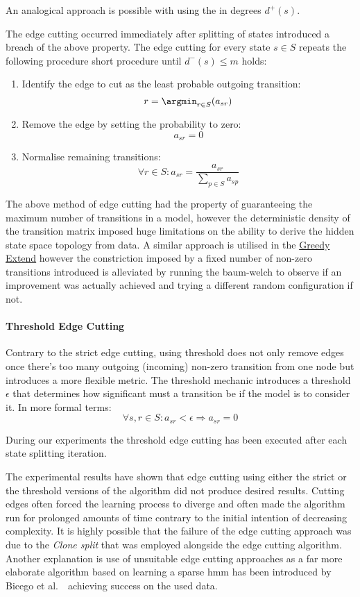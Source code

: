 An analogical approach is possible with using the in degrees $d^+(s)$.

The edge cutting occurred immediately after splitting of states introduced a breach of the above property. The edge cutting for every state $s\in S$ repeats the following procedure short procedure until $d^-(s) \le m$ holds:
\begin{enumerate}
	\item Identify the edge to cut as the least probable outgoing transition:
	$$r = \argmin_{r\in S}(a_{sr})$$
	\item Remove the edge by setting the probability to zero: $$a_{sr} = 0$$
	\item Normalise remaining transitions:
	$$\forall r \in S: a_{sr} = \frac{a_{sr}}{\sum_{p\in S}a_{sp}}$$
\end{enumerate}

The above method of edge cutting had the property of guaranteeing the maximum number of transitions in a model, however the deterministic density of the transition matrix imposed huge limitations on the ability to derive the hidden state space topology from data. A similar approach is utilised in the \hyperref[sec:greedy_extend]{Greedy Extend} however the constriction imposed by a fixed number of non-zero transitions introduced is alleviated by running the \gls{baum-welch} to observe if an improvement was actually achieved and trying a different random configuration if not.

\paragraph {Threshold Edge Cutting}
Contrary to the strict edge cutting, using threshold does not only remove edges once there's too many outgoing (incoming) non-zero transition from one node but introduces a more flexible metric. The threshold mechanic introduces a threshold $\epsilon$ that determines how significant must a transition be if the model is to consider it. In more formal terms:
$$\forall s,r\in S: a_{sr} < \epsilon \Rightarrow a_{sr} = 0$$

During our experiments the threshold edge cutting has been executed after each state splitting iteration. 

The experimental results have shown that edge cutting using either the strict or the threshold versions of the algorithm did not produce desired results. Cutting edges often forced the learning process to diverge and often made the algorithm run for prolonged amounts of time contrary to the initial intention of decreasing complexity. It is highly possible that the failure of the edge cutting approach was due to the \emph{Clone split} that was employed alongside the edge cutting algorithm. Another explanation is use of unsuitable edge cutting approaches as a far more elaborate algorithm based on learning a sparse \gls{hmm} has been introduced by Bicego et al.~\cite{bicego2007}~achieving success on the used data.

